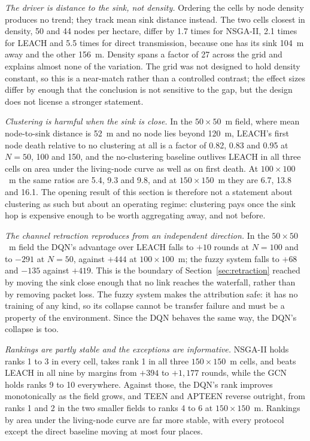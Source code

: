\emph{The driver is distance to the sink, not density.} Ordering the cells by
node density produces no trend; they track mean sink distance instead. The two
cells closest in density, 50 and 44 nodes per hectare, differ by 1.7 times for
NSGA-II, 2.1 times for LEACH and 5.5 times for direct transmission, because one
has its sink 104~m away and the other 156~m. Density spans a factor of 27 across
the grid and explains almost none of the variation. The grid was not designed to
hold density constant, so this is a near-match rather than a controlled
contrast; the effect sizes differ by enough that the conclusion is not sensitive
to the gap, but the design does not license a stronger statement.

\emph{Clustering is harmful when the sink is close.} In the $50\times50$~m
field, where mean node-to-sink distance is 52~m and no node lies beyond 120~m,
LEACH's first node death relative to no clustering at all is a factor of 0.82,
0.83 and 0.95 at $N = 50$, 100 and 150, and the no-clustering baseline outlives
LEACH in all three cells on area under the living-node curve as well as on first
death. At $100\times100$~m the same ratios are 5.4, 9.3 and 9.8, and at
$150\times150$~m they are 6.7, 13.8 and 16.1. The opening result of this section
is therefore not a statement about clustering as such but about an operating
regime: clustering pays once the sink hop is expensive enough to be worth
aggregating away, and not before.

\emph{The channel retraction reproduces from an independent direction.} In the
$50\times50$~m field the DQN's advantage over LEACH falls to $+10$ rounds at
$N = 100$ and to $-291$ at $N = 50$, against $+444$ at $100\times100$~m; the
fuzzy system falls to $+68$ and $-135$ against $+419$. This is the boundary of
Section~\ref{sec:retraction} reached by moving the sink close enough that no
link reaches the waterfall, rather than by removing packet loss. The fuzzy
system makes the attribution safe: it has no training of any kind, so its
collapse cannot be transfer failure and must be a property of the environment.
Since the DQN behaves the same way, the DQN's collapse is too.

\emph{Rankings are partly stable and the exceptions are informative.} NSGA-II
holds ranks 1 to 3 in every cell, takes rank 1 in all three $150\times150$~m
cells, and beats LEACH in all nine by margins from $+394$ to $+1{,}177$ rounds,
while the GCN holds ranks 9 to 10 everywhere. Against those, the DQN's rank
improves monotonically as the field grows, and TEEN and APTEEN reverse outright,
from ranks 1 and 2 in the two smaller fields to ranks 4 to 6 at
$150\times150$~m. Rankings by area under the living-node curve are far more
stable, with every protocol except the direct baseline moving at most four
places.

